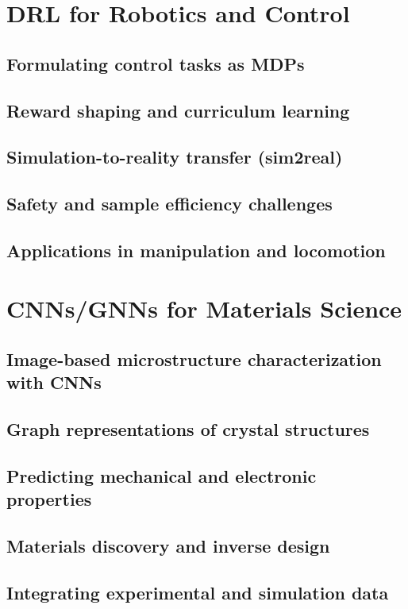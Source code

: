 \section{DRL for Robotics and Control}
\subsection{Formulating control tasks as MDPs}
\subsection{Reward shaping and curriculum learning}
\subsection{Simulation-to-reality transfer (sim2real)}
\subsection{Safety and sample efficiency challenges}
\subsection{Applications in manipulation and locomotion}

\section{CNNs/GNNs for Materials Science}
\subsection{Image-based microstructure characterization with CNNs}
\subsection{Graph representations of crystal structures}
\subsection{Predicting mechanical and electronic properties}
\subsection{Materials discovery and inverse design}
\subsection{Integrating experimental and simulation data}


